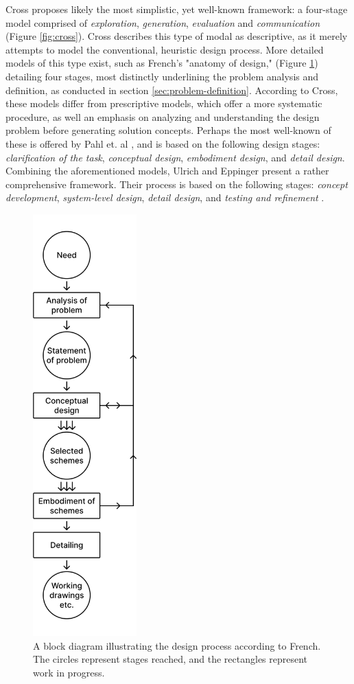 Cross \cite{cross} proposes likely the most simplistic, yet well-known framework: a four-stage model comprised of \textit{exploration}, \textit{generation}, \textit{evaluation} and \textit{communication} (Figure \ref{fig:cross}). Cross describes this type of modal as descriptive, as it merely attempts to model the conventional, heuristic design process. More detailed models of this type exist, such as French's \cite{french} "anatomy of design," (Figure \ref{fig:french}) detailing four stages, most distinctly underlining the problem analysis and definition, as conducted in section \ref{sec:problem-definition}. According to Cross, these models differ from prescriptive models, which offer a more systematic procedure, as well an emphasis on analyzing and understanding the design problem before generating solution concepts. Perhaps the most well-known of these is offered by Pahl et. al \cite{pahl_beitz}, and is based on the following design stages: \textit{clarification of the task}, \textit{conceptual design}, \textit{embodiment design}, and \textit{detail design}. Combining the aforementioned models, Ulrich and Eppinger present a rather comprehensive framework. Their process is based on the following stages: \textit{concept development}, \textit{system-level design}, \textit{detail design}, and \textit{testing and refinement} \cite{ulrich_eppinger}.

\begin{figure}[htb!]
  \centering
  \includegraphics[width=4cm]{Pictures/Figures/french.png}
  \caption{A block diagram illustrating the design process according to French. The circles represent stages reached, and the rectangles represent work in progress.}
  \label{fig:french}
\end{figure}

